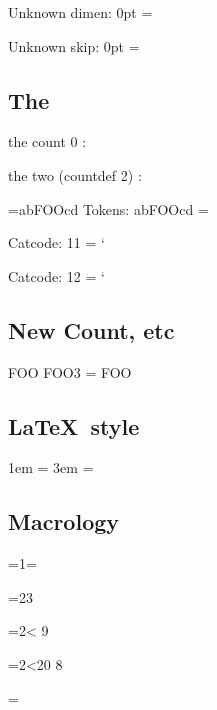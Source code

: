\documentclass{article}
\begin{document}
Unknown dimen: 0pt = \the{}\relax

Unknown skip: 0pt = \the{}\relax

\subsection{The}
the count 0 : \the{}

the two (countdef 2) : \the\two


\def\foo{FOO}


={ab\foo cd}
Tokens: abFOOcd = \the{}

Catcode: 11 = \the\catcode`\A

Catcode: 12 = \the\catcode`\@


\subsection{New Count, etc}
\newcount\foo
\foo3 = \the\foo

\subsection{\LaTeX\ style}
\newlength{\foolen}
\setlength{\foolen}{1em}
1em = \the\foolen
\addtolength{\foolen}{2em}
3em = \the\foolen

\subsection{Macrology}
\def\numthree{3}
=1=\the{}

=2\numthree\relax
[23=\the\count2]

=2< 9\fi
[29=\the\count2]

=2\ifnum{}<20 8\fi
[29=\the\count2]

\makeatletter
\count\tw@=\@M\relax
[10000=\the\count\tw@]
[\chardef\mydollar=36\relax
\$a\$ = \mydollar a\mydollar]

\makeatother
\end{document}
